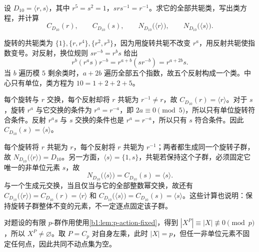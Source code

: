 \begin{exercise}\label{b1:ex:04-3}
	设 \(D_{10}=\langle r,s\rangle\)，其中 \(r^5=s^2=1\)，\(srs^{-1}=r^{-1}\)。求它的全部共轭类，写出类方程，并计算
	\[
		C_{D_{10}}(r),\qquad C_{D_{10}}(s),\qquad N_{D_{10}}\bigl(\langle r\rangle\bigr),\qquad N_{D_{10}}\bigl(\langle s\rangle\bigr).
	\]
\end{exercise}
\begin{solution}
	旋转的共轭类为 \(\{1\},\{r,r^4\},\{r^2,r^3\}\)，因为用旋转共轭不改变 \(r^a\)，用反射共轭使指数变号。对反射，换位规则 \(sr^{-b}=r^bs\) 给出
	\[
		r^b(r^as)r^{-b}=r^{a+b}(sr^{-b})=r^{a+2b}s.
	\]
	当 \(b\) 遍历模 \(5\) 剩余类时，\(a+2b\) 遍历全部五个指数，故五个反射构成一个类。中心只有单位，类方程为 \(10=1+2+2+5\)。

	每个旋转与 \(r\) 交换，每个反射却将 \(r\) 共轭为 \(r^{-1}\neq r\)，故 \(C_{D_{10}}(r)=\langle r\rangle\)。对于 \(s\)，旋转 \(r^a\) 与它交换的条件为 \(r^a=r^{-a}\)，即 \(2a\equiv0\pmod5\)，所以只有单位旋转符合条件。反射 \(r^as\) 与 \(s\) 交换的条件也是 \(r^a=r^{-a}\)，所以只有 \(s\) 符合条件。因此 \(C_{D_{10}}(s)=\langle s\rangle\)。

	每个旋转将 \(r\) 共轭为 \(r\)，每个反射将 \(r\) 共轭为 \(r^{-1}\)；两者都生成同一个旋转子群，故 \(N_{D_{10}}\bigl(\langle r\rangle\bigr)=D_{10}\)。另一方面，\(\langle s\rangle=\{1,s\}\)，共轭若保持这个子群，必须固定它唯一的非单位元素 \(s\)，故
	\[
		N_{D_{10}}\bigl(\langle s\rangle\bigr) =C_{D_{10}}(s)=\langle s\rangle.
	\]
	与一个生成元交换，当且仅当与它的全部整数幂交换，故还有 \(C_{D_{10}}\bigl(\langle r\rangle\bigr)=C_{D_{10}}(r)=\langle r\rangle\) 和 \(C_{D_{10}}\bigl(\langle s\rangle\bigr)=C_{D_{10}}(s)=\langle s\rangle\)。这些计算也说明：保持旋转子群整体不变的元素，不一定逐点固定该子群。
\end{solution}

\begin{solution}
	对题设的有限 \(p\)-群作用使用\cref{b1:lem:p-action-fixed}，得到 \(|X^P|\equiv|X|\not\equiv0\pmod p\)，所以 \(X^P\neq\varnothing\)。取 \(P=C_p\) 对自身左乘，此时 \(|X|=p\)，但任一非单位元素不固定任何点，因此共同不动点集为空。
\end{solution}

